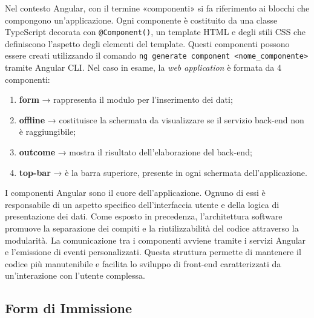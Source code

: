 Nel contesto Angular, con il termine «componenti» si fa riferimento ai blocchi che compongono un’applicazione. Ogni componente è costituito da una classe TypeScript decorata con \texttt{@Component()}, un template HTML e degli stili CSS che definiscono l’aspetto degli elementi del template. Questi componenti possono essere creati utilizzando il comando \texttt{ng generate component <nome\_componente>} tramite Angular CLI.
Nel caso in esame, la \textit{web application} è formata da 4 componenti:
\begin{enumerate}
    \item \textbf{form} → rappresenta il modulo per l’inserimento dei dati;
    \item \textbf{offline} → costituisce la schermata da visualizzare se il servizio back-end non è raggiungibile;
    \item \textbf{outcome} → mostra il risultato dell’elaborazione del back-end;
    \item \textbf{top-bar} → è la barra superiore, presente in ogni schermata dell’applicazione.
\end{enumerate}
I componenti Angular sono il cuore dell'applicazione. Ognuno di essi è responsabile di un aspetto specifico dell'interfaccia utente e della logica di presentazione dei dati. Come esposto in precedenza, l'architettura software promuove la separazione dei compiti e la riutilizzabilità del codice attraverso la modularità. La comunicazione tra i componenti avviene tramite i servizi Angular e l'emissione di eventi personalizzati. Questa struttura permette di mantenere il codice più manutenibile e facilita lo sviluppo di front-end caratterizzati da un’interazione con l’utente complessa.

\subsection{Form di Immissione}

